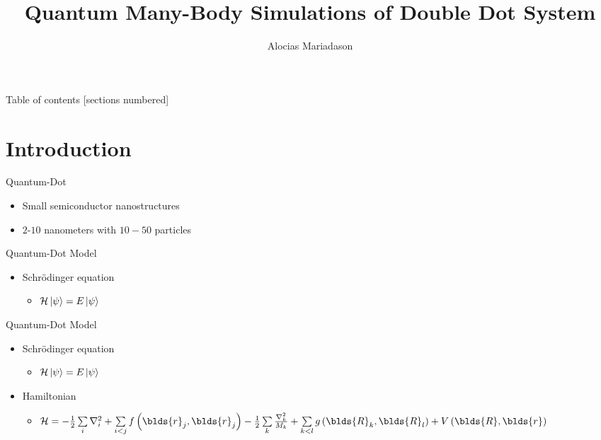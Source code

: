 \documentclass[10pt, t]{beamer}
\title{Quantum Many-Body Simulations of Double Dot System}
\date{}
\author{Alocias Mariadason}
\institute{Institute of Physics}
\begin{document}
\maketitle

\begin{frame}{Table of contents}
  [sections numbered]
  \tableofcontents[hideallsubsections]
\end{frame}

\section{Introduction}

\begin{frame}[fragile]{Quantum-Dot}
    \begin{itemize}
        \item Small semiconductor nanostructures
        \item $2$-$10$ nanometers with $10-50$ particles
    \end{itemize}
\end{frame}

\begin{frame}[fragile]{Quantum-Dot Model}
    \begin{itemize}
        \item Schrödinger equation 
            \begin{itemize}
                \item $\mathcal{H}\ket{\psi} = E\ket{\psi}$
            \end{itemize}
    \end{itemize}
\end{frame}

\begin{frame}[fragile]{Quantum-Dot Model}
    \begin{itemize}
        \item Schrödinger equation 
            \begin{itemize}
                \item $\mathcal{H}\ket{\psi} = E\ket{\psi}$
            \end{itemize}
        \item Hamiltonian
            \begin{itemize}
                \item $\mathcal{H} = - \frac{1}{2} \sum\limits_i \nabla^2_i +
                    \sum\limits_{i<j} f\left(\blds{r}_j, \blds{r}_j\right) -
                    \frac{1}{2} \sum\limits_k \frac{\nabla^2_k}{M_k} + \sum\limits_{k<l}
                    g\left(\blds{R}_k,\blds{R}_l\right) +
                    V\left(\blds{R},\blds{r}\right)$
            \end{itemize}
    \end{itemize}
\end{frame}
\end{document}
